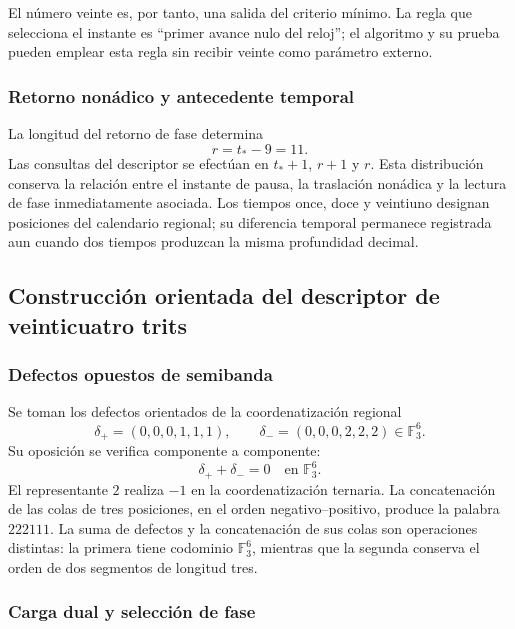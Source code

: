 El número veinte es, por tanto, una salida del criterio mínimo. La regla
que selecciona el instante es ``primer avance nulo del reloj''; el
algoritmo y su prueba pueden emplear esta regla sin recibir veinte como
parámetro externo.

\subsubsection{Retorno nonádico y antecedente temporal}

La longitud del retorno de fase determina
\begin{equation}
 r=t_*-9=11.
 \label{act21:eq:kdes-retorno}
\end{equation}
Las consultas del descriptor se efectúan en $t_*+1$, $r+1$ y $r$.
Esta distribución conserva la relación entre el instante de pausa, la
traslación nonádica y la lectura de fase inmediatamente asociada. Los
tiempos once, doce y veintiuno designan posiciones del calendario
regional; su diferencia temporal permanece registrada aun cuando dos
tiempos produzcan la misma profundidad decimal.

\subsection{Construcción orientada del descriptor de veinticuatro trits}

\subsubsection{Defectos opuestos de semibanda}

Se toman los defectos orientados de la coordenatización regional
\[
 \delta_+=(0,0,0,1,1,1),\qquad
 \delta_-=(0,0,0,2,2,2)\in\mathbb F_3^6.
\]
Su oposición se verifica componente a componente:
\[
 \delta_++\delta_-=0\quad\text{en }\mathbb F_3^6.
\]
El representante $2$ realiza $-1$ en la coordenatización ternaria. La concatenación
de las colas de tres posiciones, en el orden negativo--positivo, produce
la palabra $222111$. La suma de defectos y la concatenación de sus
colas son operaciones distintas: la primera tiene codominio
$\mathbb F_3^6$, mientras que la segunda conserva el orden de dos
segmentos de longitud tres.

\subsubsection{Carga dual y selección de fase}

